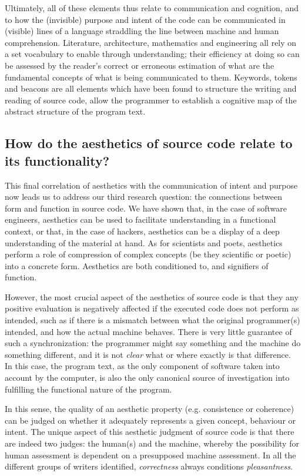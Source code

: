 Ultimately, all of these elements thus relate to communication and cognition, and to how the (invisible) purpose and intent of the code can be communicated in (visible) lines of a language straddling the line between machine and human comprehension. Literature, architecture, mathematics and engineering all rely on a set vocabulary to enable through understanding; their efficiency at doing so can be assessed by the reader's correct or erroneous estimation of what are the fundamental concepts of what is being communicated to them. Keywords, tokens and beacons are all elements which have been found to structure the writing and reading of source code, allow the programmer to establish a cognitive map of the abstract structure of the program text.

\subsection{How do the aesthetics of source code relate to its functionality?}
\label{subsec:conclusion-rq-3}

This final correlation of aesthetics with the communication of intent and purpose now leads us to address our third research question: the connections between form and function in source code. We have shown that, in the case of software engineers, aesthetics can be used to facilitate understanding in a functional context, or that, in the case of hackers, aesthetics can be a display of a deep understanding of the material at hand. As for scientists and poets, aesthetics perform a role of compression of complex concepts (be they scientific or poetic) into a concrete form. Aesthetics are both conditioned to, and signifiers of function.

However, the most crucial aspect of the aesthetics of source code is that they any positive evaluation is negatively affected if the executed code does not perform as intended, such as if there is a mismatch between what the original programmer(s) intended, and how the actual machine behaves. There is very little guarantee of such a synchronization: the programmer might say something and the machine do something different, and it is not \emph{clear} what or where exactly is that difference. In this case, the program text, as the only component of software taken into account by the computer, is also the only canonical source of investigation into fulfilling the functional nature of the program.

In this sense, the quality of an aesthetic property (e.g. consistence or coherence) can be judged on whether it adequately represents a given concept, behaviour or intent. The unique aspect of this aesthetic judgment of source code is that there are indeed two judges: the human(s) and the machine, whereby the possibility for human assessment is dependent on a presupposed machine assessment. In all the different groups of writers identified, \emph{correctness} always conditions \emph{pleasantness}.

